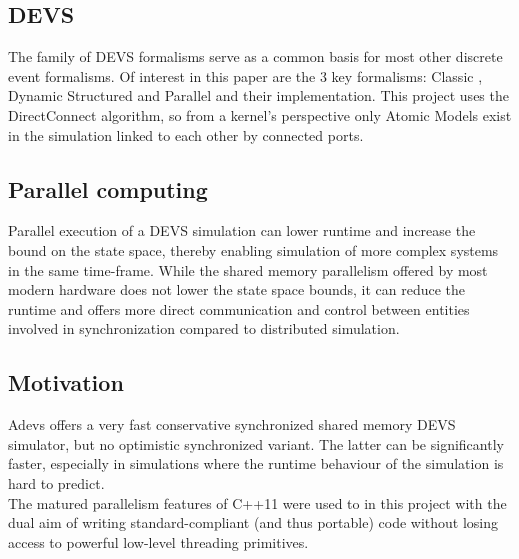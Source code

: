 \subsection{DEVS}
The family of DEVS \cite{DEVSbase} formalisms serve as a common basis for most other discrete event formalisms. Of interest in this paper are the 3 key formalisms: Classic \cite{ClassicDEVS}, Dynamic Structured \cite{DSDEVS} and Parallel \cite{ParallelDEVS} and their implementation. This project uses the DirectConnect \cite{SymbolicFlattening} algorithm, so from a kernel's perspective only Atomic Models exist in the simulation linked to each other by connected ports.

\subsection{Parallel computing}
Parallel execution of a DEVS simulation can lower runtime and increase the bound on the state space, thereby enabling simulation of more complex systems in the same time-frame.
While the shared memory parallelism offered by most modern hardware does not lower the state space bounds, it can reduce the runtime and offers more direct communication and control between entities involved in synchronization compared to distributed simulation. \\

\subsection{Motivation}
Adevs \cite{adevs} offers a very fast conservative synchronized shared memory DEVS simulator, but no optimistic synchronized variant. 
The latter can be significantly faster, especially in simulations where the runtime behaviour of the simulation is hard to predict. \\
The matured parallelism features of C++11 were used to in this project with the dual aim of writing standard-compliant (and thus portable) code without losing access to powerful low-level threading primitives. %

